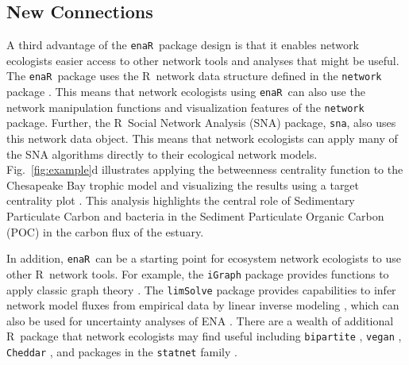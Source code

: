 \documentclass[11pt]{article}
\newcommand{\R}{R}
\newcommand{\enaR}{\texttt{enaR}}
\begin{document}
\begin{spacing}{2}
\subsection{New Connections}
A third advantage of the \enaR\ package design is that it enables
network ecologists easier access to other network tools and analyses
that might be useful.  The \enaR\ package uses the \R\ network data
structure defined in the \texttt{network} package
\citep{butts08_network}.  This means that network ecologists using \enaR\
can also use the network manipulation functions and visualization
features of the \texttt{network} package. Further, the \R\ Social
Network Analysis (SNA) package, \texttt{sna}, \citep{butts08_social} also uses this
network data object.  This means that network ecologists can apply
many of the SNA algorithms directly to their ecological network
models.  Fig.~\ref{fig:example}d illustrates applying the betweenness
centrality function to the Chesapeake Bay trophic model
\citep{baird89} and visualizing the results using a target
centrality plot \citep{brandes03}.  This analysis highlights the
central role of Sedimentary Particulate Carbon and bacteria in the
Sediment Particulate Organic Carbon (POC) in the carbon flux of the
estuary.

In addition, \enaR\ can be a starting point for ecosystem network
ecologists to use other \R\ network tools.  For example, the
\texttt{iGraph} package provides functions to apply classic graph
theory \citep{csardi06}.  The \texttt{limSolve} package provides
capabilities to infer network model fluxes from empirical data by
linear inverse modeling \citep{soetaert09}, which can also be used for
uncertainty analyses of ENA \citep{kones09}. There are a wealth of
additional \R\ package that network ecologists may find useful
including \texttt{bipartite} \citep{dormann2008}, \texttt{vegan}
\citep{dixon2003vegan}, \texttt{Cheddar}
\citep{hudson2013}, and packages in the \texttt{statnet} family
\citep{handcock2008statnet}.


\end{spacing}
\end{document}
